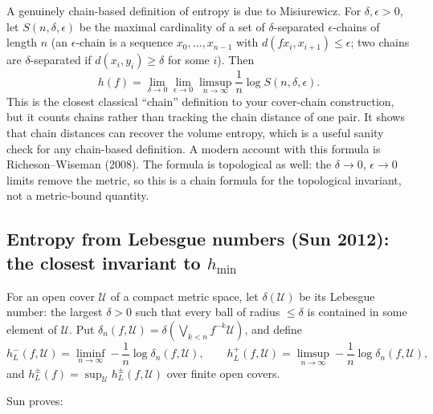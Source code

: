 \documentclass[
]{article}
\begin{document}
A genuinely chain-based definition of entropy is due to Misiurewicz. For
\(\delta,\epsilon>0\), let \(S(n,\delta,\epsilon)\) be the maximal
cardinality of a set of \(\delta\)-separated \(\epsilon\)-chains of
length \(n\) (an \(\epsilon\)-chain is a sequence \(x_0,\dots,x_{n-1}\)
with \(d(fx_i,x_{i+1})\le\epsilon\); two chains are \(\delta\)-separated
if \(d(x_i,y_i)\ge\delta\) for some \(i\)). Then \[
h(f)=\lim_{\delta\to0}\lim_{\epsilon\to0}\limsup_{n\to\infty}\frac1n\log S(n,\delta,\epsilon).
\] This is the closest classical ``chain'' definition to your
cover-chain construction, but it counts chains rather than tracking the
chain distance of one pair. It shows that chain distances can recover
the volume entropy, which is a useful sanity check for any chain-based
definition. A modern account with this formula is Richeson--Wiseman
(2008). The formula is topological as well: the \(\delta\to0\),
\(\epsilon\to0\) limits remove the metric, so this is a chain formula
for the topological invariant, not a metric-bound quantity.

\subsection{\texorpdfstring{Entropy from Lebesgue numbers (Sun 2012):
the closest invariant to
\(h_{\min}\)}{Entropy from Lebesgue numbers (Sun 2012): the closest invariant to h\_\{\textbackslash min\}}}\label{entropy-from-lebesgue-numbers-sun-2012-the-closest-invariant-to-h_min}

For an open cover \(\mathcal U\) of a compact metric space, let
\(\delta(\mathcal U)\) be its Lebesgue number: the largest \(\delta>0\)
such that every ball of radius \(\le\delta\) is contained in some
element of \(\mathcal U\). Put
\(\delta_n(f,\mathcal U)=\delta(\bigvee_{k<n}f^{-k}\mathcal U)\), and
define \[
h_L^-(f,\mathcal U)=\liminf_{n\to\infty}-\frac1n\log\delta_n(f,\mathcal U),\qquad
h_L^+(f,\mathcal U)=\limsup_{n\to\infty}-\frac1n\log\delta_n(f,\mathcal U),
\] and \(h_L^\pm(f)=\sup_{\mathcal U}h_L^\pm(f,\mathcal U)\) over finite
open covers.

Sun proves:
\end{document}
